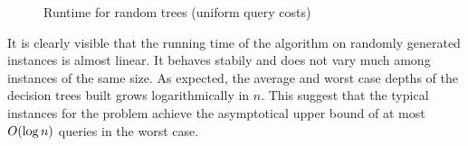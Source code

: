 \begin{figure}[!h]
\centering
{}
\caption{Runtime for random trees (uniform query costs)}
\label{fig:random_uniform_time}
\end{figure}
\FloatBarrier

It is clearly visible that the running time of the algorithm on randomly generated instances is almost linear. It behaves stabily and does not vary much among instances of the same size. As expected, the average and worst case depths of the decision trees built grows logarithmically in $n$. This suggest that the typical instances for the problem achieve the asymptotical upper bound of at most $O\mathopen{}\left( \log n \right)$ queries in the worst case.